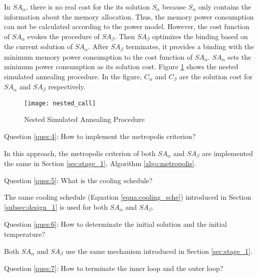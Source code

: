 		In $SA_{\alpha}$, there is no real cost for the its solution $S_{\alpha}$
		because $S_{\alpha}$ only contains the information about the memory allocation.
		Thus, the memory power consumption can not be calculated according to the
		power model.
		However, the cost function of $SA_{\alpha}$ evokes the procedure of $SA_{\beta}$.
		Then $SA_{\beta}$ optimizes the binding based on the current solution of $SA_{\alpha}$. After $SA_{\beta}$ terminates, it provides a binding with the minimum memory power consumption to the cost function of $SA_{\alpha}$.
		$SA_{\alpha}$ sets the minimum power consumption as its solution cost.
		Figure \ref{fig:nested_call} shows the nested simulated annealing procedure.
		In the figure, $C_{\alpha}$ and $C_{\beta}$ are the solution cost for $SA_{\alpha}$
		and $SA_{\beta}$ respectively.
		\begin{figure}[h]
			\begin{center}
				\texttt{[image: nested\_call]}
				\caption{Nested Simulated Annealing Procedure}
				\label{fig:nested_call}
			\end{center}
		\end{figure}

		Question \ref{ques:4}: How to implement the metropolis criterion?

		In this approach, the metropolis criterion of both $SA_{\alpha}$ and
		$SA_{\beta}$ are implemented the same in Section \ref{sec:stage_1},
		Algorithm \ref{algo:metropolis}.
		
		Question \ref{ques:5}: What is the cooling schedule?
		
		The same cooling schedule (Equation \ref{equa:cooling_sche}) introduced
		in Section \ref{subsec:design_1} is used for both $SA_{\alpha}$ and $SA_{\beta}$.
		
		Question \ref{ques:6}: How to determinate the initial solution and the
		initial temperature?
		
		Both $SA_{\alpha}$ and $SA_{\beta}$ use the same mechanism introduced in Section
		\ref{sec:stage_1}.
		
		Question \ref{ques:7}: How to terminate the inner loop and the outer loop?
	

